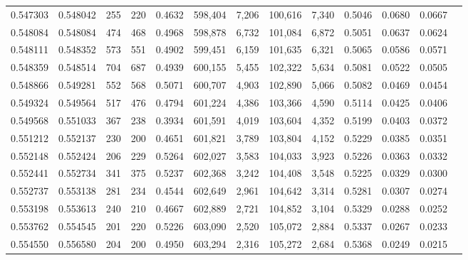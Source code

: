 \begin{tabular}{rrrrrrrrrrrrr}
0.547303 & 0.548042 &    255 &   220 &                                     0.4632 & 598,404 &   7,206 & 100,616 &   7,340 & 0.5046 & 0.0680 & 0.0667 \\
0.548084 & 0.548084 &    474 &   468 &                                     0.4968 & 598,878 &   6,732 & 101,084 &   6,872 & 0.5051 & 0.0637 & 0.0624 \\
0.548111 & 0.548352 &    573 &   551 &                                     0.4902 & 599,451 &   6,159 & 101,635 &   6,321 & 0.5065 & 0.0586 & 0.0571 \\
0.548359 & 0.548514 &    704 &   687 &                                     0.4939 & 600,155 &   5,455 & 102,322 &   5,634 & 0.5081 & 0.0522 & 0.0505 \\
0.548866 & 0.549281 &    552 &   568 &                                     0.5071 & 600,707 &   4,903 & 102,890 &   5,066 & 0.5082 & 0.0469 & 0.0454 \\
0.549324 & 0.549564 &    517 &   476 &                                     0.4794 & 601,224 &   4,386 & 103,366 &   4,590 & 0.5114 & 0.0425 & 0.0406 \\
0.549568 & 0.551033 &    367 &   238 &                                     0.3934 & 601,591 &   4,019 & 103,604 &   4,352 & 0.5199 & 0.0403 & 0.0372 \\
0.551212 & 0.552137 &    230 &   200 &                                     0.4651 & 601,821 &   3,789 & 103,804 &   4,152 & 0.5229 & 0.0385 & 0.0351 \\
0.552148 & 0.552424 &    206 &   229 &                                     0.5264 & 602,027 &   3,583 & 104,033 &   3,923 & 0.5226 & 0.0363 & 0.0332 \\
0.552441 & 0.552734 &    341 &   375 &                                     0.5237 & 602,368 &   3,242 & 104,408 &   3,548 & 0.5225 & 0.0329 & 0.0300 \\
0.552737 & 0.553138 &    281 &   234 &                                     0.4544 & 602,649 &   2,961 & 104,642 &   3,314 & 0.5281 & 0.0307 & 0.0274 \\
0.553198 & 0.553613 &    240 &   210 &                                     0.4667 & 602,889 &   2,721 & 104,852 &   3,104 & 0.5329 & 0.0288 & 0.0252 \\
0.553762 & 0.554545 &    201 &   220 &                                     0.5226 & 603,090 &   2,520 & 105,072 &   2,884 & 0.5337 & 0.0267 & 0.0233 \\
0.554550 & 0.556580 &    204 &   200 &                                     0.4950 & 603,294 &   2,316 & 105,272 &   2,684 & 0.5368 & 0.0249 & 0.0215 \\

\end{tabular}
